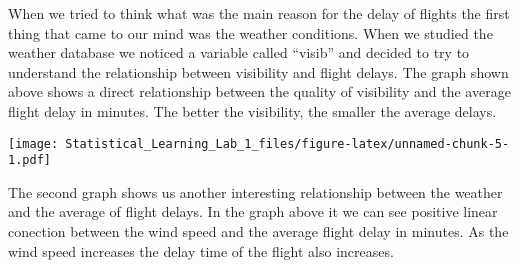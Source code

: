 \documentclass[
]{article}
\newenvironment{Shaded}{\begin{snugshade}}{\end{snugshade}}
\newcommand{\CommentTok}[1]{\textcolor[rgb]{0.56,0.35,0.01}{\textit{#1}}}
\newcommand{\DataTypeTok}[1]{\textcolor[rgb]{0.13,0.29,0.53}{#1}}
\newcommand{\DecValTok}[1]{\textcolor[rgb]{0.00,0.00,0.81}{#1}}
\newcommand{\KeywordTok}[1]{\textcolor[rgb]{0.13,0.29,0.53}{\textbf{#1}}}
\newcommand{\NormalTok}[1]{#1}
\newcommand{\OperatorTok}[1]{\textcolor[rgb]{0.81,0.36,0.00}{\textbf{#1}}}
\newcommand{\StringTok}[1]{\textcolor[rgb]{0.31,0.60,0.02}{#1}}
\begin{document}
When we tried to think what was the main reason for the delay of flights
the first thing that came to our mind was the weather conditions. When
we studied the weather database we noticed a variable called ``visib''
and decided to try to understand the relationship between visibility and
flight delays. The graph shown above shows a direct relationship between
the quality of visibility and the average flight delay in minutes. The
better the visibility, the smaller the average delays.

\begin{Shaded}
\end{Shaded}

\texttt{[image: Statistical\_Learning\_Lab\_1\_files/figure-latex/unnamed-chunk-5-1.pdf]}

The second graph shows us another interesting relationship between the
weather and the average of flight delays. In the graph above it we can
see positive linear conection between the wind speed and the average
flight delay in minutes. As the wind speed increases the delay time of
the flight also increases.
\end{document}
